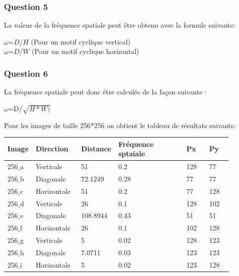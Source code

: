 \documentclass[a4paper,12pt]{report}
\begin{document}
\subsubsection*{Question 5}
La valeur de la fréquence spatiale peut être obtenu avec la formule suivante: \\
\begin{center}
	$\omega$=$D$/$H$ (Pour un motif cyclique vertical) \\
	$\omega$=$D$/$W$ (Pour un motif cyclique horizontal)
\end{center}

\subsubsection*{Question 6}
La fréquence spatiale peut donc être calculée de la façon suivante :
\begin{center}
	$\omega$=D/$\sqrt{H*W)}$
\end{center}
Pour les images de taille 256*256 on obtient le tableau de résultats suivants:

\begin{center}
\begin{longtable}[c]{|p{0.1\linewidth}| p{0.2\linewidth}| p{0.1\linewidth}|p{0.3\linewidth}|p{0.1\linewidth}|p{0.1\linewidth}|} 

	\hline
		
	\cellcolor{gray!40}\textbf{Image}	& \cellcolor{gray!40}\textbf{Direction} & \cellcolor{gray!40}\textbf{Distance}& \cellcolor{gray!40}\textbf{Fréquence sptaiale}& \cellcolor{gray!40}\textbf{Px} & \cellcolor{gray!40}\textbf{Py} \\ \hline
	
	
256$\_$a	&Verticale		&51			&0.2					&128						&77 \\ \hline
256$\_$b	&Diagonale		&72.1249		&0.28				&77						&77\\ \hline
256$\_$c	&Horizontale		&51			&0.2					&77						&128\\ \hline
256$\_$d	&Verticale		&26			&0.1					&128						&102\\ \hline
256$\_$e	&Diagonale		&108.8944	&0.43				&51						&51\\ \hline
256$\_$f	&Horizontale		&26			&0.1					&102						&128\\ \hline
256$\_$g	&Verticale		&5			&0.02				&128						&123\\ \hline
256$\_$h	&Diagonale		&7.0711		&0.03				&123						&123\\ \hline
256$\_$i	&Horizontale		&5			&0.02				&123						&128\\ \hline
	
\end{longtable}
\end{center}
\end{document}
